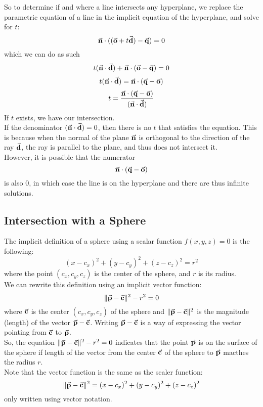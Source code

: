 \documentclass[12pt]{article}
\begin{document}
    So to determine if and where a line intersects 
    any hyperplane,
    we replace the parametric equation of a line
    in the implicit equation of the hyperplane,
    and solve for $t$:
    \[
        \vec{\mathbf{n}} \cdot ((\vec{\mathbf{o}} + t\vec{\mathbf{d}}) - \vec{\mathbf{q}}) = 0
    \]
    which we can do as such
    \[
        t(\vec{\mathbf{n}} \cdot \vec{\mathbf{d}}) 
        + \vec{\mathbf{n}} \cdot (\vec{\mathbf{o}} - \vec{\mathbf{q}}) = 0
    \]
    \[
        t(\vec{\mathbf{n}} \cdot \vec{\mathbf{d}}) =
        \vec{\mathbf{n}} \cdot (\vec{\mathbf{q}} - \vec{\mathbf{o}})
    \]
    \[
        t = \dfrac  {\vec{\mathbf{n}} \cdot (\vec{\mathbf{q}} - \vec{\mathbf{o}})}
                    {(\vec{\mathbf{n}} \cdot \vec{\mathbf{d}})}
    \]
    If $t$ exists, we have our intersection. \\
    If the denominator $(\vec{\mathbf{n}} \cdot \vec{\mathbf{d}}) = 0$,
    then there is no $t$ that satisfies the equation.
    This is because when the normal of the plane $\vec{\mathbf{n}}$
    is orthogonal to the direction of the ray $\vec{\mathbf{d}}$,
    the ray is parallel to the plane,
    and thus does not intersect it. \\
    However, it is possible that the numerator
    \[\vec{\mathbf{n}} \cdot (\vec{\mathbf{q}} - \vec{\mathbf{o}})\]
    is also $0$,
    in which case the line is on the hyperplane
    and there are thus infinite solutions. \\

    \newpage

    \subsection*{Intersection with a Sphere}
    
    The implicit definition of a sphere
    using a scalar function $f(x, y, z) = 0$ is the following:
    \[
        (x - c_x)^2 +  (y - c_y)^2 +  (z - c_z)^2 = r^2 
    \]
    where the point $(c_x, c_y, c_z)$
    is the center of the sphere,
    and $r$ is its radius. \\

    We can rewrite this definition using an
    implicit vector function:
    \[ \| \vec{\mathbf{p}} - \vec{\mathbf{c}} \|^2 - r^2 = 0 \]
    where $\vec{\mathbf{c}}$
    is the center $(c_x, c_y, c_z)$ of the sphere
    and $\|\vec{\mathbf{p}} - \vec{\mathbf{c}} \|^2$ is the magnitude (length)
    of the vector $\vec{\mathbf{p}} - \vec{\mathbf{c}}$.
    Writing $\vec{\mathbf{p}} - \vec{\mathbf{c}}$ is a way of expressing
    the vector pointing from $\vec{\mathbf{c}}$ to $\vec{\mathbf{p}}$. \\
    So, the equation 
    $\| \vec{\mathbf{p}} - \vec{\mathbf{c}} \|^2 - r^2 = 0$
    indicates that the point $\vec{\mathbf{p}}$ is
    on the surface of the sphere
    if length of the vector
    from the center $\vec{\mathbf{c}}$ of the sphere
    to $\vec{\mathbf{p}}$ macthes the radius $r$. \\
    Note that the vector function
    is the same as the scaler function:
    \[ 
        \| \vec{\mathbf{p}} - \vec{\mathbf{c}} \|^2
        = (x - c_x)^2 
        + (y - c_y)^2 +  (z - c_z)^2
    \]
    only written using vector notation. \\
\end{document}
